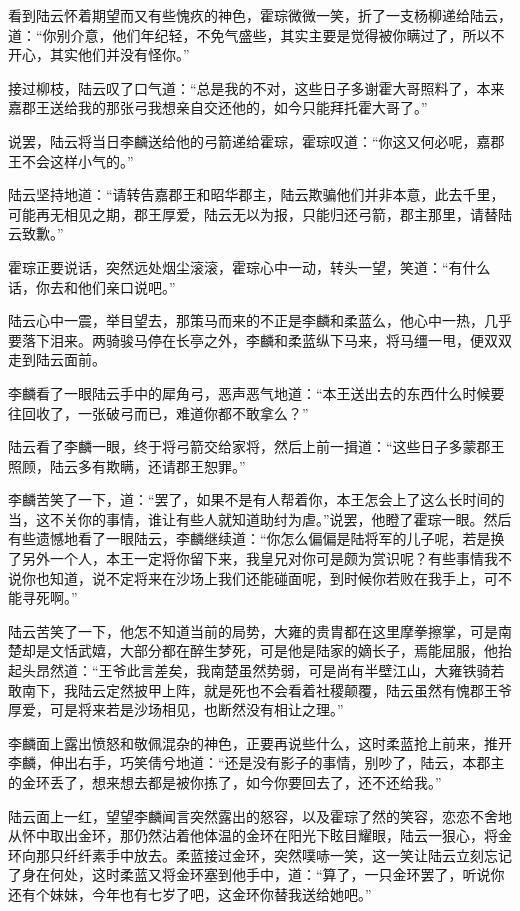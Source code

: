 看到陆云怀着期望而又有些愧疚的神色，霍琮微微一笑，折了一支杨柳递给陆云，道：“你别介意，他们年纪轻，不免气盛些，其实主要是觉得被你瞒过了，所以不开心，其实他们并没有怪你。”

接过柳枝，陆云叹了口气道：“总是我的不对，这些日子多谢霍大哥照料了，本来嘉郡王送给我的那张弓我想亲自交还他的，如今只能拜托霍大哥了。”

说罢，陆云将当日李麟送给他的弓箭递给霍琮，霍琮叹道：“你这又何必呢，嘉郡王不会这样小气的。”

陆云坚持地道：“请转告嘉郡王和昭华郡主，陆云欺骗他们并非本意，此去千里，可能再无相见之期，郡王厚爱，陆云无以为报，只能归还弓箭，郡主那里，请替陆云致歉。”

霍琮正要说话，突然远处烟尘滚滚，霍琮心中一动，转头一望，笑道：“有什么话，你去和他们亲口说吧。”

陆云心中一震，举目望去，那策马而来的不正是李麟和柔蓝么，他心中一热，几乎要落下泪来。两骑骏马停在长亭之外，李麟和柔蓝纵下马来，将马缰一甩，便双双走到陆云面前。

李麟看了一眼陆云手中的犀角弓，恶声恶气地道：“本王送出去的东西什么时候要往回收了，一张破弓而已，难道你都不敢拿么？”

陆云看了李麟一眼，终于将弓箭交给家将，然后上前一揖道：“这些日子多蒙郡王照顾，陆云多有欺瞒，还请郡王恕罪。”

李麟苦笑了一下，道：“罢了，如果不是有人帮着你，本王怎会上了这么长时间的当，这不关你的事情，谁让有些人就知道助纣为虐。”说罢，他瞪了霍琮一眼。然后有些遗憾地看了一眼陆云，李麟继续道：“你怎么偏偏是陆将军的儿子呢，若是换了另外一个人，本王一定将你留下来，我皇兄对你可是颇为赏识呢？有些事情我不说你也知道，说不定将来在沙场上我们还能碰面呢，到时候你若败在我手上，可不能寻死啊。”

陆云苦笑了一下，他怎不知道当前的局势，大雍的贵胄都在这里摩拳擦掌，可是南楚却是文恬武嬉，大部分都在醉生梦死，可是他是陆家的嫡长子，焉能屈服，他抬起头昂然道：“王爷此言差矣，我南楚虽然势弱，可是尚有半壁江山，大雍铁骑若敢南下，我陆云定然披甲上阵，就是死也不会看着社稷颠覆，陆云虽然有愧郡王爷厚爱，可是将来若是沙场相见，也断然没有相让之理。”

李麟面上露出愤怒和敬佩混杂的神色，正要再说些什么，这时柔蓝抢上前来，推开李麟，伸出右手，巧笑倩兮地道：“还是没有影子的事情，别吵了，陆云，本郡主的金环丢了，想来想去都是被你拣了，如今你要回去了，还不还给我。”

陆云面上一红，望望李麟闻言突然露出的怒容，以及霍琮了然的笑容，恋恋不舍地从怀中取出金环，那仍然沾着他体温的金环在阳光下眩目耀眼，陆云一狠心，将金环向那只纤纤素手中放去。柔蓝接过金环，突然噗哧一笑，这一笑让陆云立刻忘记了身在何处，这时柔蓝又将金环塞到他手中，道：“算了，一只金环罢了，听说你还有个妹妹，今年也有七岁了吧，这金环你替我送给她吧。”

